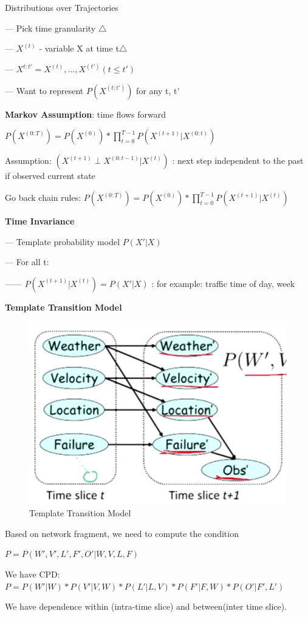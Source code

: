 \documentclass{book}
\begin{document}
Distributions over Trajectories

--- Pick time granularity $\triangle$

--- $X^{(t)}$ - variable X at time t$\triangle$ 

--- $X^{t:t'} = {X^{(t)}, ..., X^{(t')}} (t \leq t')$

--- Want to represent $P(X^{(t:t')})$ for any t, t'

\textbf{Markov Assumption}: time flows forward

$P(X^{(0:T)}) = P(X^{(0)}) * \prod_{t=0}^{T-1} P(X^{(t+1)} | X^{(0:t)})$

Assumption: $(X^{(t+1)} \perp X^{(0:t-1)} | X^{(t)})$ : next step independent to the past if observed current state

Go back chain rules: $P(X^{(0:T)}) = P(X^{(0)}) * \prod_{t=0}^{T-1} P(X^{(t+1)} | X^{(t)})$

\textbf{Time Invariance}

--- Template probability model $P(X'|X)$

--- For all t:

------ $P(X^{(t+1)}| X^{(t)}) = P(X'|X)$ : for example: traffic time of day, week


\textbf{Template Transition Model}

\begin{figure}[h]
\centering
\includegraphics[width=0.7\linewidth]{./figures/templatetransition}
\caption{Template Transition Model}
\label{fig:templatetransition}
\end{figure}

Based on network fragment, we need to compute the condition 

$P = P(W',V',L',F',O' | W,V,L,F)$

We have CPD: $P = P(W'|W) * P(V'|V,W) * P(L'|L,V) * P(F'|F,W) *P(O'|F',L')$

We have dependence within (intra-time slice) and between(inter time slice).
\end{document}
